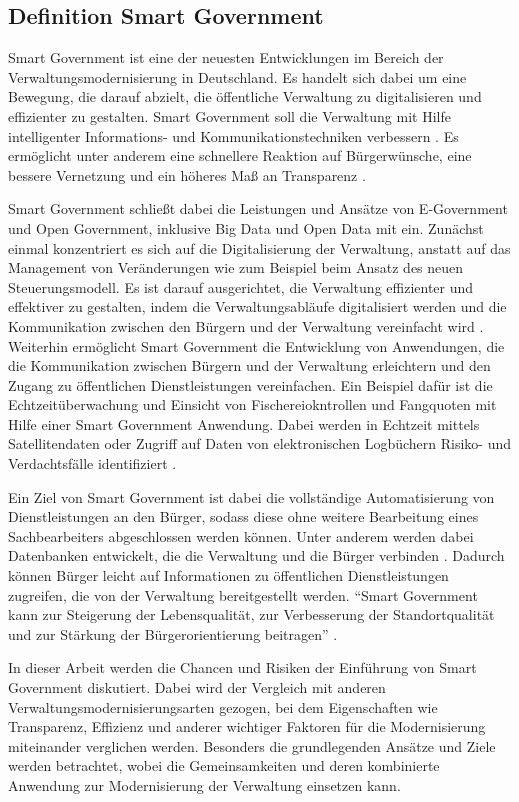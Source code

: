 \subsection{Definition Smart Government}
Smart Government ist eine der neuesten Entwicklungen im Bereich der Verwaltungsmodernisierung in Deutschland. 
Es handelt sich dabei um eine Bewegung, die darauf abzielt, die öffentliche Verwaltung zu digitalisieren und effizienter zu gestalten. 
Smart Government soll die Verwaltung mit Hilfe intelligenter Informations- und Kommunikationstechniken verbessern \citep[][S.178]{von_Lucke_2016}.
Es ermöglicht unter anderem eine schnellere Reaktion auf Bürgerwünsche, eine bessere Vernetzung und ein höheres Maß an Transparenz \citep[Vgl][S.87]{Kersting2017}.
\par
Smart Government schließt dabei die Leistungen und Ansätze von E-Government und Open Government, inklusive Big Data und Open Data mit ein.
Zunächst einmal konzentriert es sich auf die Digitalisierung der Verwaltung, anstatt auf das Management von Veränderungen wie zum Beispiel beim Ansatz des neuen Steuerungsmodell. 
Es ist darauf ausgerichtet, die Verwaltung effizienter und effektiver zu gestalten, indem die Verwaltungsabläufe digitalisiert werden und die Kommunikation zwischen den Bürgern und der Verwaltung vereinfacht wird \citep[Vgl.][]{von_Lucke_2016}.
Weiterhin ermöglicht Smart Government die Entwicklung von Anwendungen, die die Kommunikation zwischen Bürgern und der Verwaltung erleichtern und den Zugang zu öffentlichen Dienstleistungen vereinfachen. 
Ein Beispiel dafür ist die Echtzeitüberwachung und Einsicht von Fischereiokntrollen und Fangquoten mit Hilfe einer Smart Government Anwendung.
Dabei werden in Echtzeit mittels Satellitendaten oder Zugriff auf Daten von elektronischen Logbüchern Risiko- und Verdachtsfälle identifiziert \citep[][]{LandwirtschaftundErnaehrung2023}. 
\par
Ein Ziel von Smart Government ist dabei die vollständige Automatisierung von Dienstleistungen an den Bürger, sodass diese ohne weitere Bearbeitung eines Sachbearbeiters abgeschlossen werden können.
Unter anderem werden dabei Datenbanken entwickelt, die die Verwaltung und die Bürger verbinden \citep[Vgl.][]{von_Lucke_2016}. 
Dadurch können Bürger leicht auf Informationen zu öffentlichen Dienstleistungen zugreifen, die von der Verwaltung bereitgestellt werden.
``Smart Government kann zur Steigerung der Lebensqualität, zur Verbesserung der Standortqualität und zur Stärkung der Bürgerorientierung beitragen'' \citep[][]{von_Lucke_2016}. 
\par
In dieser Arbeit werden die Chancen und Risiken der Einführung von Smart Government diskutiert.
Dabei wird der Vergleich mit anderen Verwaltungsmodernisierungsarten gezogen, bei dem Eigenschaften wie Transparenz, Effizienz und anderer wichtiger Faktoren für die Modernisierung miteinander verglichen werden.
Besonders die grundlegenden Ansätze und Ziele werden betrachtet, wobei die Gemeinsamkeiten und deren kombinierte Anwendung zur Modernisierung der Verwaltung einsetzen kann.

